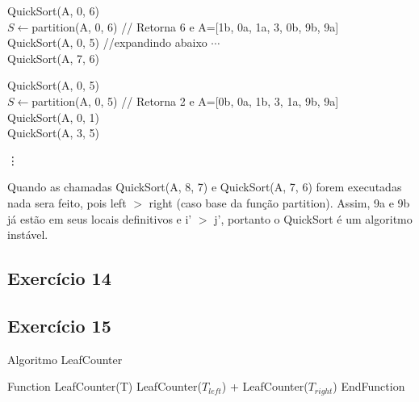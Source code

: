 \begin{tabbing}
QuickSort(A, 0, 6) \\
  \hspace{1em}$S \leftarrow $partition(A, 0, 6) // Retorna 6 e A=[1b, 0a, 1a, 3, 0b, 9b, 9a] \\
  \hspace{1em}QuickSort(A, 0, 5) //expandindo abaixo $\cdots$ \\
  \hspace{1em}QuickSort(A, 7, 6)
\end{tabbing}

\begin{tabbing}
QuickSort(A, 0, 5) \\
  \hspace{1em}$S \leftarrow $partition(A, 0, 5) // Retorna 2 e A=[0b, 0a, 1b, 3, 1a, 9b, 9a] \\
  \hspace{1em}QuickSort(A, 0, 1)  \\
  \hspace{1em}QuickSort(A, 3, 5)
\end{tabbing}

\begin{tabbing}
\hspace{1em} \vdots
\end{tabbing}

Quando as chamadas QuickSort(A, 8, 7) e QuickSort(A, 7, 6) forem executadas nada sera feito, pois
left $>$ right (caso base da função partition). Assim, 9a e 9b já estão em seus locais 
definitivos e i' $>$ j', portanto o QuickSort é um algoritmo instável.

\subsection{Exercício 14}\label{sec:exer14}




\subsection{Exercício 15}\label{sec:exer15}

\begin{algorithm}
  \caption{Algoritmo LeafCounter}
  \begin{algorithmic}
    \STATE Function LeafCounter(T)
      \ENDIF
      \ENDIF
      \RETURN LeafCounter($T_{left}$) + LeafCounter($T_{right}$)
    \STATE EndFunction
  \end{algorithmic}
\end{algorithm}


